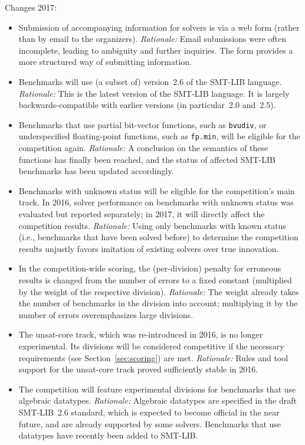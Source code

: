\documentclass[twoside,11pt]{article}
\begin{document}
\begin{tjark}
Changes 2017:
\begin{itemize}
\item Submission of accompanying information for solvers is via a web
  form (rather than by email to the organizers).  \emph{Rationale:}
  Email submissions were often incomplete, leading to ambiguity and
  further inquiries.  The form provides a more structured way of
  submitting information.
\item Benchmarks will use (a subset of) version~2.6 of the SMT-LIB
  language.  \emph{Rationale:} This is the latest version of the
  SMT-LIB language.  It is largely backwards-compatible with earlier
  versions (in particular~2.0 and~2.5).
\item Benchmarks that use partial bit-vector functions, such as
  \texttt{bvudiv}, or underspecified floating-point functions, such as
  \texttt{fp.min}, will be eligible for the competition again.
  \emph{Rationale:} A conclusion on the semantics of these functions
  has finally been reached, and the status of affected SMT-LIB
  benchmarks has been updated accordingly.
\item Benchmarks with unknown status will be eligible for the
  competition's main track.  In 2016, solver performance on benchmarks
  with unknown status was evaluated but reported separately; in 2017,
  it will directly affect the competition results.  \emph{Rationale:}
  Using only benchmarks with known status (i.e., benchmarks that have
  been solved before) to determine the competition results unjustly
  favors imitation of existing solvers over true innovation.
\item In the competition-wide scoring, the (per-division) penalty for
  erroneous results is changed from the number of errors to a fixed
  constant (multiplied by the weight of the respective division).
  \emph{Rationale:} The weight already takes the number of benchmarks
  in the division into account; multiplying it by the number of errors
  overemphasizes large divisions.
\item The unsat-core track, which was re-introduced in 2016, is no
  longer experimental.  Its divisions will be considered competitive
  if the necessary requirements (see Section~\ref{sec:scoring}) are
  met.  \emph{Rationale:} Rules and tool support for the unsat-core
  track proved sufficiently stable in 2016.
\item The competition will feature experimental divisions for
  benchmarks that use algebraic datatypes.  \emph{Rationale:}
  Algebraic datatypes are specified in the draft SMT-LIB~2.6 standard,
  which is expected to become official in the near future, and are
  already supported by some solvers.  Benchmarks that use datatypes
  have recently been added to SMT-LIB.
\end{itemize}


\end{tjark}
\end{document}
